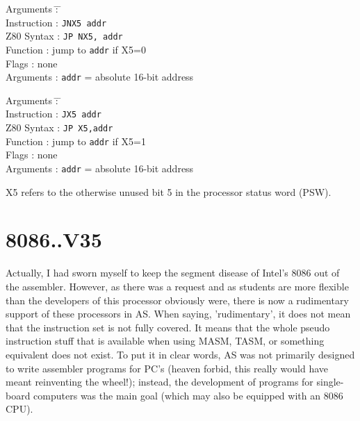 \documentclass[12pt,twoside]{report}
\newcommand{\tty}[1]{{\tt #1}}
\begin{document}
\begin{tabbing}
Arguments         \= : \= \kill \\
Instruction       \> : \> \tty{JNX5 addr} \\
Z80 Syntax        \> : \> \tty{JP NX5, addr} \\
Function          \> : \> jump to {\tt addr} if X5=0 \\
Flags             \> : \> none \\
Arguments         \> : \> {\tt addr} = absolute 16-bit address \\
\end{tabbing}

\begin{tabbing}
Arguments         \= : \= \kill \\
Instruction       \> : \> \tty{JX5 addr} \\
Z80 Syntax        \> : \> \tty{JP X5,addr} \\
Function          \> : \> jump to {\tt addr} if X5=1 \\
Flags             \> : \> none \\
Arguments         \> : \> {\tt addr} = absolute 16-bit address \\
\end{tabbing}

X5 refers to the otherwise unused bit 5 in the processor status word (PSW).


\section{8086..V35}

Actually, I had sworn myself to keep the segment disease of Intel's
8086 out of the assembler.  However, as there was a request and as
students are more flexible than the developers of this processor
obviously were, there is now a rudimentary support of these
processors in AS.  When saying, 'rudimentary', it does not mean that
the instruction set is not fully covered.  It means that the whole
pseudo instruction stuff that is available when using MASM, TASM, or
something equivalent does not exist.  To put it in clear words, AS
was not primarily designed to write assembler programs for PC's
(heaven forbid, this really would have meant reinventing the wheel!);
instead, the development of programs for single-board computers was
the main goal (which may also be equipped with an 8086 CPU).
\end{document}
